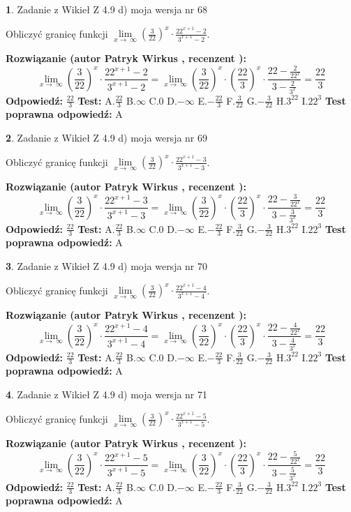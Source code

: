 \documentclass[12pt, a4paper]{article}
\theoremstyle{definition} %
\newtheorem{zad}{}
\newcommand{\zadStart}[1]{\begin{zad}#1\newline}
\newcommand{\zadStop}{\end{zad}}
\newcommand{\rozwStart}[2]{\noindent \textbf{Rozwiązanie (autor #1 , recenzent #2): }\newline}
\newcommand{\rozwStop}{\newline}
\newcommand{\odpStart}{\noindent \textbf{Odpowiedź:}\newline}
\newcommand{\odpStop}{\newline}
\newcommand{\testStart}{\noindent \textbf{Test:}\newline}
\newcommand{\testStop}{\newline}
\newcommand{\kluczStart}{\noindent \textbf{Test poprawna odpowiedź:}\newline}
\newcommand{\kluczStop}{\newline}
\begin{document}
\zadStart{Zadanie z Wikieł Z 4.9 d) moja wersja nr 68}


Obliczyć granicę funkcji  $\lim\limits_{x\to\ \infty}(\frac{3}{22})^{x}\cdot\frac{22^{x+1}-2}{3^{x+1}-2}$.
\zadStop
\rozwStart{Patryk Wirkus}{}
$$\lim\limits_{x\to\ \infty}(\frac{3}{22})^{x}\cdot\frac{22^{x+1}-2}{3^{x+1}-2}=\lim\limits_{x\to\ \infty}(\frac{3}{22})^{x}\cdot(\frac{22}{3})^{x} \cdot \frac{22-\frac{2}{22^{x}}}{3-\frac{2}{3^{x}}} = \frac{22}{3}$$
\rozwStop
\odpStart
$\frac{22}{3}$
\odpStop
\testStart
A.$\frac{22}{3}$ B.$\infty$ C.$0$ D.$-\infty$ E.$-\frac{22}{3}$
F.$\frac{3}{22}$ G.$-\frac{3}{22}$
H.$3^{22}$
I.$22^{3}$
\testStop
\kluczStart
A
\kluczStop



\zadStart{Zadanie z Wikieł Z 4.9 d) moja wersja nr 69}


Obliczyć granicę funkcji  $\lim\limits_{x\to\ \infty}(\frac{3}{22})^{x}\cdot\frac{22^{x+1}-3}{3^{x+1}-3}$.
\zadStop
\rozwStart{Patryk Wirkus}{}
$$\lim\limits_{x\to\ \infty}(\frac{3}{22})^{x}\cdot\frac{22^{x+1}-3}{3^{x+1}-3}=\lim\limits_{x\to\ \infty}(\frac{3}{22})^{x}\cdot(\frac{22}{3})^{x} \cdot \frac{22-\frac{3}{22^{x}}}{3-\frac{3}{3^{x}}} = \frac{22}{3}$$
\rozwStop
\odpStart
$\frac{22}{3}$
\odpStop
\testStart
A.$\frac{22}{3}$ B.$\infty$ C.$0$ D.$-\infty$ E.$-\frac{22}{3}$
F.$\frac{3}{22}$ G.$-\frac{3}{22}$
H.$3^{22}$
I.$22^{3}$
\testStop
\kluczStart
A
\kluczStop



\zadStart{Zadanie z Wikieł Z 4.9 d) moja wersja nr 70}


Obliczyć granicę funkcji  $\lim\limits_{x\to\ \infty}(\frac{3}{22})^{x}\cdot\frac{22^{x+1}-4}{3^{x+1}-4}$.
\zadStop
\rozwStart{Patryk Wirkus}{}
$$\lim\limits_{x\to\ \infty}(\frac{3}{22})^{x}\cdot\frac{22^{x+1}-4}{3^{x+1}-4}=\lim\limits_{x\to\ \infty}(\frac{3}{22})^{x}\cdot(\frac{22}{3})^{x} \cdot \frac{22-\frac{4}{22^{x}}}{3-\frac{4}{3^{x}}} = \frac{22}{3}$$
\rozwStop
\odpStart
$\frac{22}{3}$
\odpStop
\testStart
A.$\frac{22}{3}$ B.$\infty$ C.$0$ D.$-\infty$ E.$-\frac{22}{3}$
F.$\frac{3}{22}$ G.$-\frac{3}{22}$
H.$3^{22}$
I.$22^{3}$
\testStop
\kluczStart
A
\kluczStop



\zadStart{Zadanie z Wikieł Z 4.9 d) moja wersja nr 71}


Obliczyć granicę funkcji  $\lim\limits_{x\to\ \infty}(\frac{3}{22})^{x}\cdot\frac{22^{x+1}-5}{3^{x+1}-5}$.
\zadStop
\rozwStart{Patryk Wirkus}{}
$$\lim\limits_{x\to\ \infty}(\frac{3}{22})^{x}\cdot\frac{22^{x+1}-5}{3^{x+1}-5}=\lim\limits_{x\to\ \infty}(\frac{3}{22})^{x}\cdot(\frac{22}{3})^{x} \cdot \frac{22-\frac{5}{22^{x}}}{3-\frac{5}{3^{x}}} = \frac{22}{3}$$
\rozwStop
\odpStart
$\frac{22}{3}$
\odpStop
\testStart
A.$\frac{22}{3}$ B.$\infty$ C.$0$ D.$-\infty$ E.$-\frac{22}{3}$
F.$\frac{3}{22}$ G.$-\frac{3}{22}$
H.$3^{22}$
I.$22^{3}$
\testStop
\kluczStart
A
\kluczStop
\end{document}

